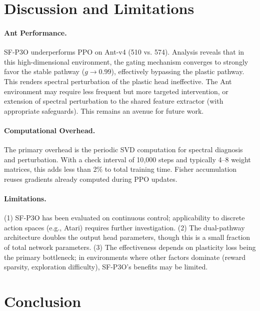 \documentclass{article}
\begin{document}
\section{Discussion and Limitations}
\label{sec:discussion}

\paragraph{Ant Performance.}
SF-P3O underperforms PPO on Ant-v4 (510 vs. 574). Analysis reveals that in this high-dimensional environment, the gating mechanism converges to strongly favor the stable pathway ($g \to 0.99$), effectively bypassing the plastic pathway. This renders spectral perturbation of the plastic head ineffective. The Ant environment may require less frequent but more targeted intervention, or extension of spectral perturbation to the shared feature extractor (with appropriate safeguards). This remains an avenue for future work.

\paragraph{Computational Overhead.}
The primary overhead is the periodic SVD computation for spectral diagnosis and perturbation. With a check interval of 10{,}000 steps and typically 4--8 weight matrices, this adds less than 2\% to total training time. Fisher accumulation reuses gradients already computed during PPO updates.

\paragraph{Limitations.}
(1) SF-P3O has been evaluated on continuous control; applicability to discrete action spaces (e.g., Atari) requires further investigation. (2) The dual-pathway architecture doubles the output head parameters, though this is a small fraction of total network parameters. (3) The effectiveness depends on plasticity loss being the primary bottleneck; in environments where other factors dominate (reward sparsity, exploration difficulty), SF-P3O's benefits may be limited.


\section{Conclusion}
\label{sec:conclusion}
\end{document}
